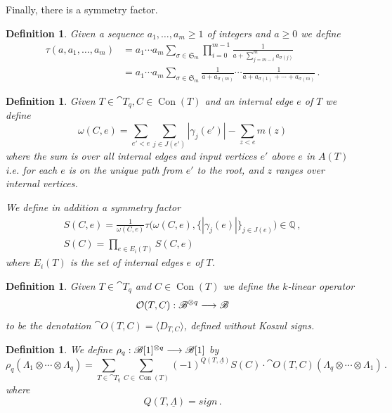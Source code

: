 \documentclass[english,letter paper,12pt,leqno]{article}
\theoremstyle{example}
\newtheorem{definition}[theorem]{Definition}
\numberwithin{equation}{section}
\begin{document}
Finally, there is a symmetry factor.

\begin{definition} Given a sequence $a_1,\ldots,a_m \ge 1$ of integers and $a \ge 0$ we define
\begin{align*}
\tau(a, a_1, \ldots, a_m) &= a_1 \cdots a_m \sum_{\sigma \in \mathfrak{S}_m} \prod_{i=0}^{m-1} \frac{1}{a + \sum_{j=m-i}^m a_{\sigma(j)}}\\
&= a_1 \cdots a_m \sum_{\sigma \in \mathfrak{S}_m} \frac{1}{a + a_{\sigma(m)}} \cdots \frac{1}{a + a_{\sigma(1)} + \cdots + a_{\sigma(m)}}\,.
\end{align*}
\end{definition}

\begin{definition} Given $T \in \cat{T}_q, C \in \operatorname{Con}(T)$ and an internal edge $e$ of $T$ we define
\[
\omega(C, e) = \sum_{e' < e} \sum_{j \in J(e')} | \gamma_j(e') | - \sum_{z < e} m(z)
\]
where the sum is over all internal edges and input vertices $e'$ above $e$ in $A(T)$ i.e. for each $e$ is on the unique path from $e'$ to the root, and $z$ ranges over internal vertices. 

We define in addition a symmetry factor
\begin{gather*}
S(C, e) = \frac{1}{\omega(C,e)} \tau\big( \omega(C,e), \{ |\gamma_j(e)| \}_{j \in J(e)} \big) \in \mathbb{Q}\,,\\
S(C) = \prod_{e \in E_i(T)} S(C,e)
\end{gather*}
where $E_i(T)$ is the set of internal edges $e$ of $T$.
\end{definition}

\begin{definition} Given $T \in \cat{T}_q$ and $C \in \operatorname{Con}(T)$ we define the $k$-linear operator
\[
\mathcal{O}(T, C): \mathscr{B}^{\otimes q} \longrightarrow \mathscr{B}
\]
to be the denotation $\cat{O}(T,C) = \langle D_{T,C} \rangle$, defined without Koszul signs.
\end{definition}

\begin{definition} We define $\rho_q: \mathscr{B}[1]^{\otimes q} \longrightarrow \mathscr{B}[1]$ by
\[
\rho_q( \Lambda_1 \otimes \cdots \otimes \Lambda_q ) = \sum_{T \in \cat{T}_q} \sum_{C \in \operatorname{Con}(T)} (-1)^{Q(T, \underline{\Lambda})} S(C) \cdot \cat{O}(T, C)( \Lambda_q \otimes \cdots \otimes \Lambda_1 )\,.
\]
where
\[
Q(T, \underline{\Lambda}) = sign\,.
\]
\end{definition}
\end{document}
